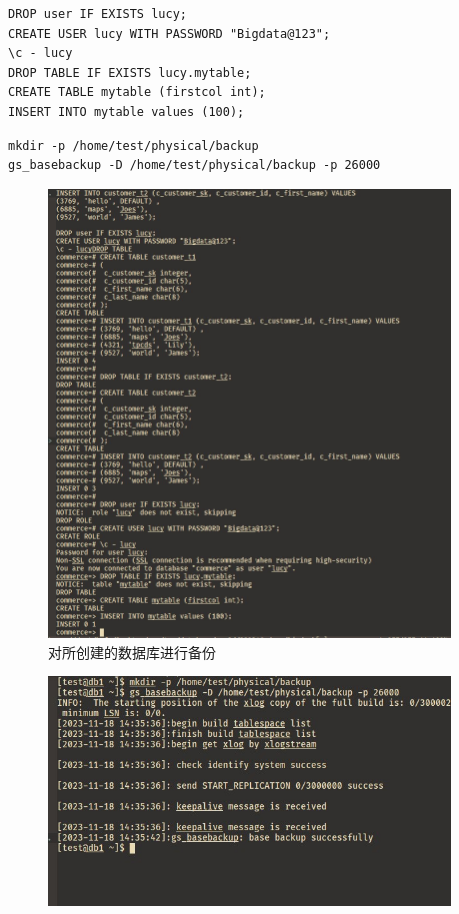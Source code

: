 \begin{enumerate}
\begin{center}
\begin{verbatim}
DROP user IF EXISTS lucy;
CREATE USER lucy WITH PASSWORD "Bigdata@123";
\c - lucy
DROP TABLE IF EXISTS lucy.mytable;
CREATE TABLE mytable (firstcol int);
INSERT INTO mytable values (100);
\end{verbatim}
\end{center}
\begin{center}
\begin{verbatim}
mkdir -p /home/test/physical/backup
gs_basebackup -D /home/test/physical/backup -p 26000
\end{verbatim}
\end{center}
\begin{figure}[H]
  \begin{center}
    \includegraphics[width=0.95\textwidth]{./figures/backup.jpg}
  \end{center}
  \caption{对所创建的数据库进行备份}
\end{figure}
\begin{figure}[H]
  \begin{center}
    \includegraphics[width=0.95\textwidth]{./figures/backup1.jpg}

\end{center}
\end{figure}
\end{enumerate}

